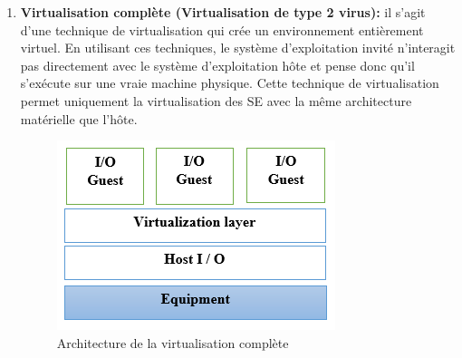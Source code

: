 \begin{enumerate}
\item \textbf{Virtualisation complète (Virtualisation de type 2 virus):} il s'agit d'une technique de virtualisation qui crée un environnement entièrement virtuel. En utilisant ces techniques, le système d'exploitation invité n'interagit pas directement avec le système d'exploitation hôte et pense donc qu'il s'exécute sur une vraie machine physique. Cette technique de virtualisation permet uniquement la virtualisation des SE avec la même architecture matérielle que l'hôte.
\begin{figure}[H]
\centering
\includegraphics[scale=1]{chap1/fc3.png}
\caption{Architecture de la virtualisation complète}
\end{figure}
\end{enumerate}
